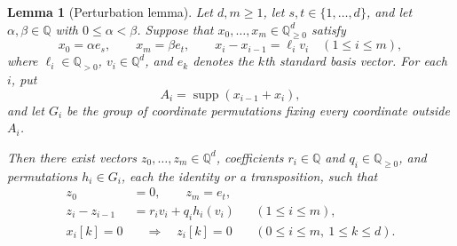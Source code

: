 \documentclass[11pt]{article}
\newtheorem{lemma}{Lemma}
\DeclareMathOperator{\supp}{supp}
\begin{document}
\begin{lemma}[Perturbation lemma]\label{lem:perturbation}
Let $d,m\geq 1$, let $s,t\in\{1,\ldots,d\}$, and let
$\alpha,\beta\in\mathbb{Q}$ with $0\leq\alpha<\beta$. Suppose that
$x_0,\ldots,x_m\in\mathbb{Q}_{\geq 0}^d$ satisfy
\[
  x_0=\alpha e_s,\qquad x_m=\beta e_t,\qquad
  x_i-x_{i-1}=\ell_i v_i\quad(1\leq i\leq m),
\]
where $\ell_i\in\mathbb{Q}_{>0}$, $v_i\in\mathbb{Q}^d$, and $e_k$ denotes the
$k$th standard basis vector. For each $i$, put
\[
  A_i=\supp(x_{i-1}+x_i),
\]
and let $G_i$ be the group of coordinate permutations fixing every
coordinate outside $A_i$.

Then there exist vectors $z_0,\ldots,z_m\in\mathbb{Q}^d$,
coefficients $r_i\in\mathbb{Q}$ and $q_i\in\mathbb{Q}_{\geq 0}$, and permutations
$h_i\in G_i$, each the identity or a transposition, such that
\begin{align}
  z_0&=0,\qquad z_m=e_t,\label{eq:perturbation-ends}\\
  z_i-z_{i-1}
    &=r_i v_i+q_i h_i(v_i)
      &&(1\leq i\leq m),\label{eq:perturbation-increments}\\
  x_i[k]=0&\quad\Longrightarrow\quad z_i[k]=0
      &&(0\leq i\leq m,\ 1\leq k\leq d).
      \label{eq:perturbation-boundary}
\end{align}
\end{lemma}
\end{document}
